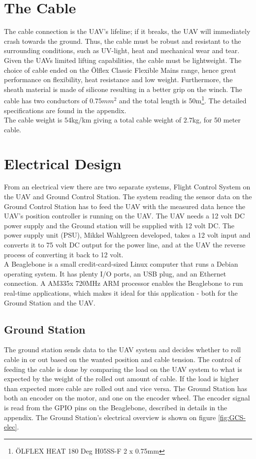 \section{The Cable}
The cable connection is the UAV's lifeline; if it breaks, the UAV will immediately crash towards the ground. Thus, the cable must be robust and resistant to the surrounding conditions, such as UV-light, heat and mechanical wear and tear.  Given the UAVs limited lifting capabilities, the cable must be lightweight. 
The choice of cable ended on the Ölflex Classic Flexible Mains range, hence great performance on flexibility, heat resistance and low weight. Furthermore, the sheath material is made of silicone resulting in a better grip on the winch. The cable has two conductors of $0.75mm^2$ and the total length is 50m\footnote{ÖLFLEX HEAT 180 Deg H05SS-F 2 x 0.75mm}. The detailed specifications are found in the appendix.\\
The cable weight is $54$kg/km giving a total cable weight of $2.7$kg, for 50 meter cable.


\section{Electrical Design}
From an electrical view there are two separate systems, Flight Control System on the UAV and Ground Control Station. The system reading the sensor data on the Ground Control Station has to feed the UAV with the measured data hence the UAV's position controller is running on the UAV. 
The UAV needs a 12 volt DC power supply and the Ground station will be supplied with 12 volt DC. The power supply unit (PSU), Mikkel Wahlgreen developed, takes a 12 volt input and converts it to 75 volt DC output for the power line, and at the UAV the reverse process of converting it back to 12 volt.\\
A Beaglebone is a small credit-card-sized Linux computer that runs a Debian operating system. It has plenty I/O ports, an USB plug, and an Ethernet connection. A AM335x 720MHz ARM processor enables the Beaglebone to run real-time applications, which makes it ideal for this application - both for the Ground Station and the UAV. 

\subsection{Ground Station}
The ground station sends data to the UAV system and decides whether to roll cable in or out based on the wanted position and cable tension. The control of feeding the cable is done by comparing the load on the UAV system to what is expected by the weight of the rolled out amount of cable. If the load is higher than expected more cable are rolled out and vice versa. The Ground Station has both an encoder on the motor, and one on the encoder wheel. The encoder signal is read from the GPIO pins on the Beaglebone, described in details in the appendix. The Ground Station's electrical overview is shown on figure \ref{fig:GCS-elec}.
  
